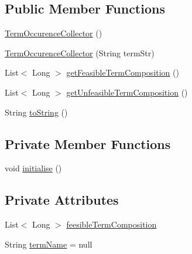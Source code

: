 \subsection*{Public Member Functions}
\begin{DoxyCompactItemize}
\item 
\hyperlink{classit_1_1emarolab_1_1cagg_1_1core_1_1evaluation_1_1semanticGrammar_1_1syntaxCompiler_1_1Gramma8ae8fecdc099d4114647279a9237b701_a0b890104819911d57c54f66ea7cd3184}{Term\-Occurence\-Collector} ()
\item 
\hyperlink{classit_1_1emarolab_1_1cagg_1_1core_1_1evaluation_1_1semanticGrammar_1_1syntaxCompiler_1_1Gramma8ae8fecdc099d4114647279a9237b701_af33af26bb7983d4d8c4a8aace9e25eca}{Term\-Occurence\-Collector} (String term\-Str)
\item 
List$<$ Long $>$ \hyperlink{classit_1_1emarolab_1_1cagg_1_1core_1_1evaluation_1_1semanticGrammar_1_1syntaxCompiler_1_1Gramma8ae8fecdc099d4114647279a9237b701_adfbff7e3acd1aef7e7cc578b6f43c069}{get\-Feasible\-Term\-Composition} ()
\item 
List$<$ Long $>$ \hyperlink{classit_1_1emarolab_1_1cagg_1_1core_1_1evaluation_1_1semanticGrammar_1_1syntaxCompiler_1_1Gramma8ae8fecdc099d4114647279a9237b701_a129af31c2a4c4e3b5b2c24a640bc1fd5}{get\-Unfeasible\-Term\-Composition} ()
\item 
String \hyperlink{classit_1_1emarolab_1_1cagg_1_1core_1_1evaluation_1_1semanticGrammar_1_1syntaxCompiler_1_1Gramma8ae8fecdc099d4114647279a9237b701_abca3d828bbe346b123cf177b306aaeb6}{to\-String} ()
\end{DoxyCompactItemize}
\subsection*{Private Member Functions}
\begin{DoxyCompactItemize}
\item 
void \hyperlink{classit_1_1emarolab_1_1cagg_1_1core_1_1evaluation_1_1semanticGrammar_1_1syntaxCompiler_1_1Gramma8ae8fecdc099d4114647279a9237b701_a0a1a0225942dc15353a1860b2b6abf38}{initialise} ()
\end{DoxyCompactItemize}
\subsection*{Private Attributes}
\begin{DoxyCompactItemize}
\item 
List$<$ Long $>$ \hyperlink{classit_1_1emarolab_1_1cagg_1_1core_1_1evaluation_1_1semanticGrammar_1_1syntaxCompiler_1_1Gramma8ae8fecdc099d4114647279a9237b701_aaff28a46d337a8af76d2aea4bb40df47}{feesible\-Term\-Composition}
\item 
String \hyperlink{classit_1_1emarolab_1_1cagg_1_1core_1_1evaluation_1_1semanticGrammar_1_1syntaxCompiler_1_1Gramma8ae8fecdc099d4114647279a9237b701_ae601d480c82b69c459050f017526f259}{term\-Name} = null
\end{DoxyCompactItemize}


